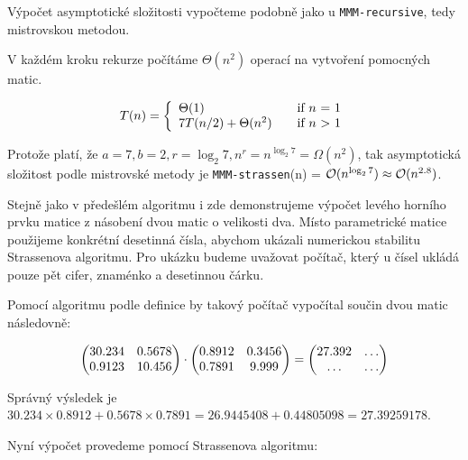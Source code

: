 Výpočet asymptotické složitosti vypočteme podobně jako u \texttt{MMM-recursive}, tedy mistrovskou metodou. 

V každém kroku rekurze počítáme $\Theta(n^2)$ operací na vytvoření pomocných matic.

\[ T(n) = \left\{ 
  \begin{array}{l l}
    \Theta(1) & \quad \text{if $n$ = 1}\\
    7T(n/2) + \Theta(n^2) & \quad \text{if $n$ > 1}
  \end{array} \right.\]

Protože platí, že $a=7, b=2, r=\log_{2} 7, n^r=n^{\log_{2} 7}=\Omega(n^2)$, tak asymptotická složitost podle mistrovské metody je \texttt{MMM-strassen}(n) = $\mathcal{O}(n^{\log_{2} 7}) \approx \mathcal{O}(n^{2.8})$.

Stejně jako v předešlém algoritmu i zde demonstrujeme výpočet levého horního prvku matice z násobení dvou matic o velikosti dva. Místo parametrické matice použijeme konkrétní desetinná čísla, abychom ukázali numerickou stabilitu Strassenova algoritmu. Pro ukázku budeme uvažovat počítač, který u čísel ukládá pouze pět cifer, znaménko a desetinnou čárku.	

Pomocí algoritmu podle definice by takový počítač vypočítal součin dvou matic následovně:

\begin{align}
\begin{pmatrix}
 30.234 & 0.5678 \\
 0.9123 & 10.456
\end{pmatrix} \cdot \begin{pmatrix}
 0.8912 & 0.3456 \\
 0.7891 & 9.999 \\
\end{pmatrix} = \begin{pmatrix}
 27.392 & \hdots \\
 \hdots & \hdots
\end{pmatrix} \notag
\end{align}

Správný výsledek je $30.234 \times 0.8912 + 0.5678 \times 0.7891 = 26.9445408 + 0.44805098 = 27.39259178$.

Nyní výpočet provedeme pomocí Strassenova algoritmu:

